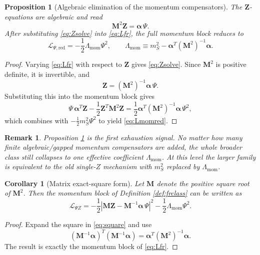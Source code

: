 \documentclass[11pt]{article}
\newtheorem{proposition}{Proposition}
\newtheorem{remark}{Remark}
\newtheorem{corollary}{Corollary}
\begin{document}
\begin{proposition}[Algebraic elimination of the momentum compensators]
\label{prop:Zsolve}
The \(\bm Z\)-equations are algebraic and read
\begin{equation}
\mathbf M^2\bm Z=\bm\alpha\,\Psi.
\label{eq:Zsolve}
\end{equation}
After substituting \eqref{eq:Zsolve} into \eqref{eq:Lfr}, the full momentum block reduces to
\begin{equation}
\mathcal L_{\Psi,\mathrm{red}}
=
-\frac12\Lambda_{\mathrm{mom}}\Psi^2,
\qquad
\Lambda_{\mathrm{mom}}
\equiv
m_S^2-\bm\alpha^T(\mathbf M^2)^{-1}\bm\alpha.
\label{eq:Lmomred}
\end{equation}
\end{proposition}

\begin{proof}
Varying \eqref{eq:Lfr} with respect to \(\bm Z\) gives \eqref{eq:Zsolve}. Since \(\mathbf M^2\) is positive definite, it is invertible, and
\[
\bm Z=(\mathbf M^2)^{-1}\bm\alpha\,\Psi.
\]
Substituting this into the momentum block gives
\[
\Psi\,\bm\alpha^T\bm Z-\frac12\bm Z^T\mathbf M^2\bm Z
=
\frac12\bm\alpha^T(\mathbf M^2)^{-1}\bm\alpha\,\Psi^2,
\]
which combines with \(-\frac12m_S^2\Psi^2\) to yield \eqref{eq:Lmomred}.
\end{proof}

\begin{remark}
Proposition \ref{prop:Zsolve} is the first exhaustion signal. No matter how many finite algebraic/gapped momentum compensators are added, the whole broader class still collapses to one effective coefficient \(\Lambda_{\mathrm{mom}}\). At this level the larger family is equivalent to the old single-\(Z\) mechanism with \(m_S^2\) replaced by \(\Lambda_{\mathrm{mom}}\).
\end{remark}

\begin{corollary}[Matrix exact-square form]
\label{cor:square}
Let \(\mathbf M\) denote the positive square root of \(\mathbf M^2\). Then the momentum block of Definition \ref{def:frclass} can be written as
\begin{equation}
\mathcal L_{\Psi Z}
=
-\frac12
\left|
\mathbf M\bm Z-\mathbf M^{-1}\bm\alpha\,\Psi
\right|^2
-\frac12\Lambda_{\mathrm{mom}}\Psi^2.
\label{eq:square}
\end{equation}
\end{corollary}

\begin{proof}
Expand the square in \eqref{eq:square} and use
\[
\left(\mathbf M^{-1}\bm\alpha\right)^T
\left(\mathbf M^{-1}\bm\alpha\right)
=
\bm\alpha^T(\mathbf M^2)^{-1}\bm\alpha.
\]
The result is exactly the momentum block of \eqref{eq:Lfr}.
\end{proof}
\end{document}
